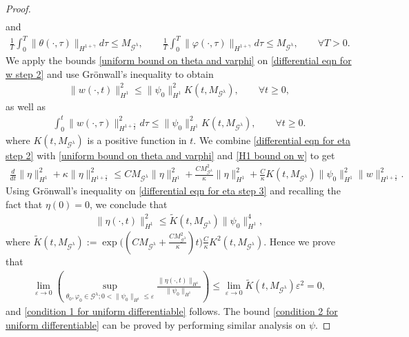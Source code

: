 \documentclass[10pt,a4paper]{amsart}
\newcommand{\Gg}{\mathcal{G}^{\lambda}}
\begin{document}
\begin{proof}
\begin{align}
\end{align}
and
\begin{align}\label{uniform bound on time integral of theta and varphi}
\frac{1}{T}\int_0^{T}\|\theta(\cdot,\tau)\|_{H^{1+\gamma}}d\tau\le M_{\Gg},\qquad \frac{1}{T}\int_0^{T}\|\varphi(\cdot,\tau)\|_{H^{1+\gamma}}d\tau\le M_{\Gg},\qquad\forall T>0.
\end{align}
We apply the bounds \eqref{uniform bound on theta and varphi} on \eqref{differential eqn for w step 2} and use Gr\"{o}nwall's inequality to obtain
\begin{align}\label{H1 bound on w}
\|w(\cdot,t)\|^2_{H^1}\le\|\psi_0\|^2_{H^1}K(t,M_{\Gg}),\qquad\forall t\ge0,
\end{align}
as well as 
\begin{align}\label{time integral on H 1+gamma/2 norm of w}
\int_0^t\|w(\cdot,\tau)\|^2_{H^{1+\frac{\gamma}{2}}}d\tau\le\|\psi_0\|^2_{H^1}K(t,M_{\Gg}),\qquad\forall t\ge0.
\end{align}
where $K(t,M_{\Gg})$ is a positive function in $t$. We combine \eqref{differential eqn for eta step 2} with \eqref{uniform bound on theta and varphi} and \eqref{H1 bound on w} to get
\begin{align}\label{differential eqn for eta step 3}
\frac{d}{dt}\|\eta\|^2_{H^1}+\kappa\|\eta\|^2_{H^{1+\frac{\gamma}{2}}}\le CM_{\Gg}\|\eta\|^2_{H^1}+\frac{CM^2_{\Gg}}{\kappa}\|\eta\|^2_{H^1}+\frac{C}{\kappa}K(t,M_{\Gg})\|\psi_0\|^2_{H^1}\|w\|^2_{H^{1+\frac{\gamma}{2}}}.
\end{align}
Using Gr\"{o}nwall's inequality on \eqref{differential eqn for eta step 3} and recalling the fact that $\eta(0)=0$, we conclude that
\begin{align*}
\|\eta(\cdot,t)\|^2_{H^1}\le \tilde K(t,M_{\Gg})\|\psi_0\|^4_{H^1},
\end{align*}
where $\tilde K(t,M_{\Gg}):=\exp\Big((CM_{\Gg}+\frac{CM^2_{\Gg}}{\kappa})t\Big)\frac{C}{\kappa}K^2(t,M_{\Gg})$. Hence we prove that
\begin{align*}
\lim_{\varepsilon\to0}\left(\sup_{\theta_0,\varphi_0\in\Gg;0<\|\psi_0\|_{H^1}\le\varepsilon}\frac{\|\eta(\cdot,t)\|_{H^1}}{\|\psi_0\|_{H^1}}\right)\le \lim_{\varepsilon\to0}\tilde K(t,M_{\Gg})\varepsilon^2=0,
\end{align*}
and \eqref{condition 1 for uniform differentiable} follows. The bound \eqref{condition 2 for uniform differentiable} can be proved by performing similar analysis on $\psi$.


\end{proof}
\end{document}
